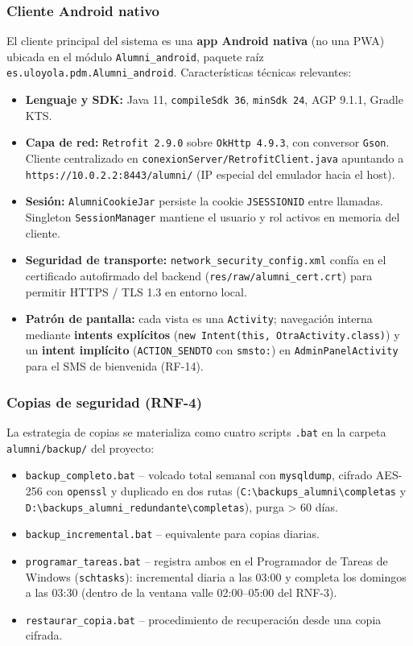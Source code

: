 \documentclass{report}
\begin{document}
\subsubsection*{Cliente Android nativo}
El cliente principal del sistema es una \textbf{app Android nativa} (no una PWA) ubicada en el módulo \texttt{Alumni\_android}, paquete raíz \texttt{es.uloyola.pdm.Alumni\_android}. Características técnicas relevantes:
\begin{itemize}
    \item \textbf{Lenguaje y SDK:} Java 11, \texttt{compileSdk 36}, \texttt{minSdk 24}, AGP 9.1.1, Gradle KTS.
    \item \textbf{Capa de red:} \texttt{Retrofit 2.9.0} sobre \texttt{OkHttp 4.9.3}, con conversor \texttt{Gson}. Cliente centralizado en \texttt{conexionServer/RetrofitClient.java} apuntando a \texttt{https://10.0.2.2:8443/alumni/} (IP especial del emulador hacia el host).
    \item \textbf{Sesión:} \texttt{AlumniCookieJar} persiste la cookie \texttt{JSESSIONID} entre llamadas. Singleton \texttt{SessionManager} mantiene el usuario y rol activos en memoria del cliente.
    \item \textbf{Seguridad de transporte:} \texttt{network\_security\_config.xml} confía en el certificado autofirmado del backend (\texttt{res/raw/alumni\_cert.crt}) para permitir HTTPS / TLS 1.3 en entorno local.
    \item \textbf{Patrón de pantalla:} cada vista es una \texttt{Activity}; navegación interna mediante \textbf{intents explícitos} (\texttt{new Intent(this, OtraActivity.class)}) y un \textbf{intent implícito} (\texttt{ACTION\_SENDTO} con \texttt{smsto:}) en \texttt{AdminPanelActivity} para el SMS de bienvenida (RF-14).
\end{itemize}

\subsubsection*{Copias de seguridad (RNF-4)}
La estrategia de copias se materializa como cuatro scripts \texttt{.bat} en la carpeta \texttt{alumni/backup/} del proyecto:
\begin{itemize}
    \item \texttt{backup\_completo.bat} -- volcado total semanal con \texttt{mysqldump}, cifrado AES-256 con \texttt{openssl} y duplicado en dos rutas (\texttt{C:\textbackslash backups\_alumni\textbackslash completas} y \texttt{D:\textbackslash backups\_alumni\_redundante\textbackslash completas}), purga > 60 días.
    \item \texttt{backup\_incremental.bat} -- equivalente para copias diarias.
    \item \texttt{programar\_tareas.bat} -- registra ambos en el Programador de Tareas de Windows (\texttt{schtasks}): incremental diaria a las 03:00 y completa los domingos a las 03:30 (dentro de la ventana valle 02:00--05:00 del RNF-3).
    \item \texttt{restaurar\_copia.bat} -- procedimiento de recuperación desde una copia cifrada.
\end{itemize}
\end{document}
